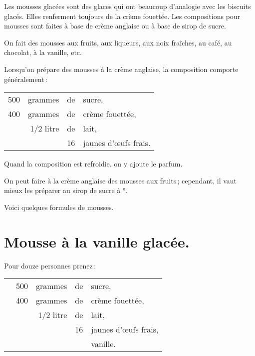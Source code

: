 \bigskip

Les mousses glacées sont des glaces qui ont beaucoup d'analogie avec les
biscuits glacés. Elles renferment toujours de la crème fouettée. Les compositions
pour mousses sont faites à base de crème anglaise ou à base de sirop de sucre.

On fait des mousses aux fruits, aux liqueurs, aux noix fraîches, au café, au
chocolat, à la vanille, etc.

Lorsqu'on prépare des mousses à la crème anglaise, la composition comporte
généralement :

\footnotesize
\begin{longtable}{rrrp{16em}}
    500 & grammes   & de & sucre,                                                                         \\
    400 & grammes   & de & crème fouettée,                                                                \\
        & 1/2 litre & de & lait,                                                                          \\
        &           & 16 & jaunes d'œufs frais.                                                           \\
\end{longtable}
\normalsize

Quand la composition est refroidie. on y ajoute le parfum.

On peut faire à la crème anglaise des mousses aux fruits ; cependant, il vaut
mieux les préparer au sirop de sucre à {\mmm}°.

\medskip

Voici quelques formules de mousses.

\medskip

\section*{\centering Mousse à la vanille glacée.}
{}

Pour douze personnes prenez :

\footnotesize
\begin{longtable}{rrrrp{16em}}
  & 500 & grammes & de & sucre,                                                                           \\
  & 400 & grammes & de & crème fouettée,                                                                  \\
  & \multicolumn{2}{r}{1/2 litre} & de & lait,                                                            \\
  &     &         & 16 & jaunes d'œufs frais,                                                             \\
  &     &         &    & vanille.                                                                         \\
\end{longtable}
\normalsize

